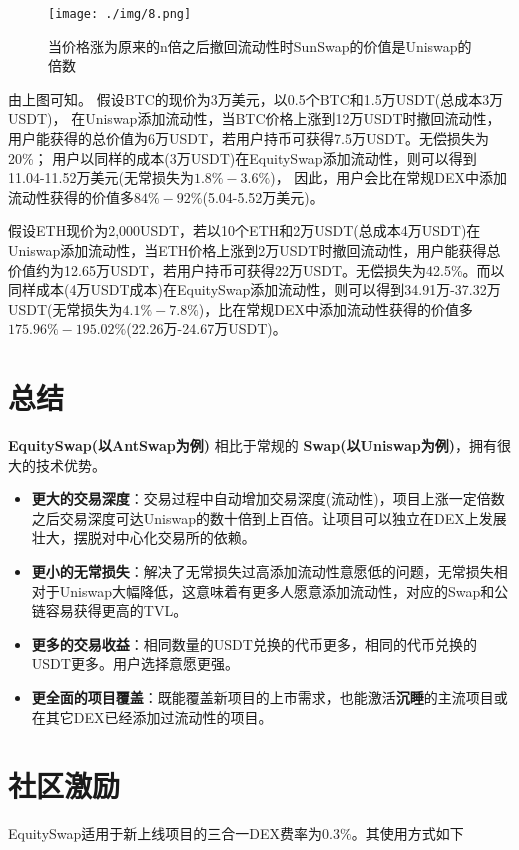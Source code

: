 \documentclass{article}
\begin{document}
\begin{figure}[H]
\centering
\texttt{[image: ./img/8.png]}
\caption{\label{fig}当价格涨为原来的n倍之后撤回流动性时SunSwap的价值是Uniswap的倍数}
\end{figure}

由上图可知。
假设BTC的现价为3万美元，以0.5个BTC和1.5万USDT(总成本3万USDT)，
在Uniswap添加流动性，当BTC价格上涨到12万USDT时撤回流动性，用户能获得的总价值为6万USDT，若用户持币可获得7.5万USDT。无偿损失为20\%；
用户以同样的成本(3万USDT)在EquitySwap添加流动性，则可以得到11.04-11.52万美元(无常损失为$1.8\%-3.6\%$)，
因此，用户会比在常规DEX中添加流动性获得的价值多$84\%-92\%$(5.04-5.52万美元)。

假设ETH现价为2,000USDT，若以10个ETH和2万USDT(总成本4万USDT)在Uniswap添加流动性，当ETH价格上涨到2万USDT时撤回流动性，用户能获得总价值约为12.65万USDT，若用户持币可获得22万USDT。无偿损失为42.5\%。而以同样成本(4万USDT成本)在EquitySwap添加流动性，则可以得到34.91万-37.32万USDT(无常损失为$4.1\%-7.8\%$)，比在常规DEX中添加流动性获得的价值多$175.96\%-195.02\%$(22.26万-24.67万USDT)。

\section{总结}

\textbf{EquitySwap(以AntSwap为例)} 相比于常规的 \textbf{Swap(以Uniswap为例)}，拥有很大的技术优势。

\begin{itemize}
  \item \textbf{更大的交易深度}：交易过程中自动增加交易深度(流动性)，项目上涨一定倍数之后交易深度可达Uniswap的数十倍到上百倍。让项目可以独立在DEX上发展壮大，摆脱对中心化交易所的依赖。
  \item \textbf{更小的无常损失}：解决了无常损失过高添加流动性意愿低的问题，无常损失相对于Uniswap大幅降低，这意味着有更多人愿意添加流动性，对应的Swap和公链容易获得更高的TVL。
  \item \textbf{更多的交易收益}：相同数量的USDT兑换的代币更多，相同的代币兑换的USDT更多。用户选择意愿更强。
  \item \textbf{更全面的项目覆盖}：既能覆盖新项目的上市需求，也能激活\textbf{沉睡}的主流项目或在其它DEX已经添加过流动性的项目。
\end{itemize}

\section{社区激励}
EquitySwap适用于新上线项目的三合一DEX费率为$0.3\%$。其使用方式如下
\end{document}
